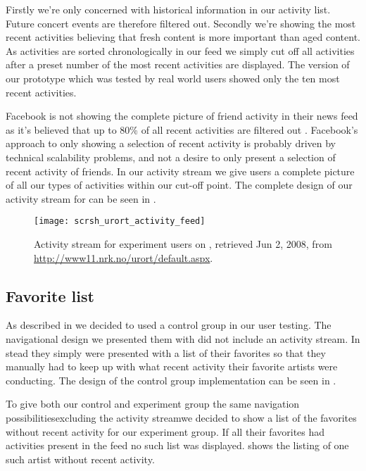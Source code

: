 Firstly we're only concerned with historical information in our activity list.
Future concert events are therefore filtered out. Secondly we're showing the
most recent activities believing that fresh content is more important than
aged content. As activities are sorted chronologically in our feed we simply
cut off all activities after a preset number of the most recent activities are
displayed. The version of our prototype which was tested by real world users
showed only the ten most recent activities.

Facebook is not showing the complete picture of friend activity in their news
feed as it's believed that up to 80\% of all recent activities are filtered
out \citep{elliott08}.
Facebook's approach to only showing a selection of recent activity is
probably driven by technical scalability problems, and not a desire to only
present a selection of recent activity of friends. In our activity stream we
give users a complete picture of all our types of activities within our
cut-off point.
The complete design of our activity stream for \urort{} can be seen in
.

\begin{figure}
  \texttt{[image: scrsh\_urort\_activity\_feed]}
  \caption[\urort{} Activity Stream]{
    Activity stream for experiment users on \urort{},
    retrieved Jun 2, 2008, from
    \url{http://www11.nrk.no/urort/default.aspx}.
  }
  \label{figure:scrsh.urort.activity.feed}
\end{figure}

\subsection{Favorite list}
\label{section:implementation.design.favorite.list}

As described in
we decided to used a control group in our user testing. The navigational
design we presented them with did not include an activity stream. In stead
they
simply were presented with a list of their favorites so that they manually had
to keep up with what recent activity their favorite artists were conducting.
The design of the control group implementation can be seen in
.

To give both our control and experiment group the same navigation
possibilities\dash{}excluding the activity stream\dash{}we decided to show a
list of the favorites without recent activity for our experiment group. If all
their favorites had activities present in the feed no such list was displayed.
 shows the listing of one such artist
without recent activity.

